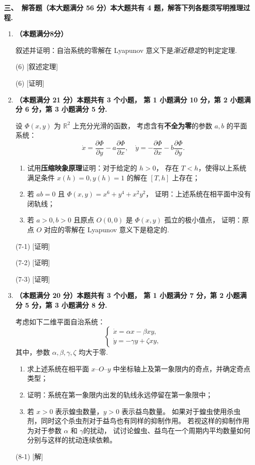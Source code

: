 \textbf{三、\ 解答题（本大题满分 56 分）本大题共有 4 题，解答下列各题须写明推理过程.}
\begin{enumerate}
\item \textbf{（本题满分8分）}

叙述并证明：自治系统的零解在 Lyapunov 意义下是\textit{渐近稳定}的判定定理.

(6) [叙述定理]

(6) [证明]

\item \textbf{（本题满分 21 分）本题共有 3 个小题，
第 1 小题满分 10 分，第 2 小题满分 6 分，第 3 小题满分 5 分.}

设 $\varPhi(x, y)$ 为 $\mathbb{R}^{2}$ 上充分光滑的函数，
考虑含有\textbf{不全为零}的参数 $a, b$ 的平面系统：
$$\dot{x}=\frac{\partial \varPhi}{\partial y}-a \frac{\partial \varPhi}{\partial x}, \quad 
\dot{y}=-\frac{\partial \varPhi}{\partial x}-b \frac{\partial \varPhi}{\partial y}.$$
\begin{enumerate}[label=(\arabic*)]
    \item 试用\textbf{压缩映象原理}证明：对于给定的 $h>0$，
    存在 $T<h$，使得以上系统满足条件 $x(h)=0, y(h)=1$ 的解在 $[T, h]$ 上存在；
    \item 若 $a b=0$ 且 $\varPhi(x, y)=x^{6}+y^{4}+x^{2} y^{2}$，
    证明：上述系统在相平面中没有闭轨线；
    \item 若 $a>0, b>0$ 且原点 $O(0,0)$ 是 $\varPhi(x, y)$ 孤立的极小值点，
    证明：原点 $O$ 对应的零解在 Lyapunov 意义下是稳定的.
\end{enumerate}
(7-1) [证明]

(7-2) [证明]

(7-3) [证明]

\item \textbf{（本题满分 20 分）本题共有 3 个小题，
第 1 小题满分 7 分，第 2 小题满分 5 分，第 3 小题满分 8 分.}

考虑如下二维平面自治系统：
$$\left\{\begin{array}{l}
\dot{x}=\alpha x-\beta x y, \\
\dot{y}=-\gamma y+\zeta x y,
\end{array}\right.$$
其中，参数 $\alpha, \beta, \gamma, \zeta$ 均大于零.
\begin{enumerate}[label=(\arabic*)]
\item 求上述系统在相平面 $x$--$O$--$y$ 中坐标轴上及第一象限内的奇点，并确定奇点类型；
\item 证明：系统在第一象限内出发的轨线永远停留在第一象限中；
\item 若 $x>0$ 表示蝗虫数量，$y>0$ 表示益鸟数量。
如果对于蝗虫使用杀虫剂，同时这个杀虫剂对于益鸟也有同样的抑制作用。
若视这样的抑制作用为对于参数 $\alpha$ 和 $\gamma$的扰动，
试讨论蝗虫、益鸟在一个周期内平均数量如何分别与这样的扰动连续依赖。
\end{enumerate}
(8-1) [解]


\end{enumerate}
